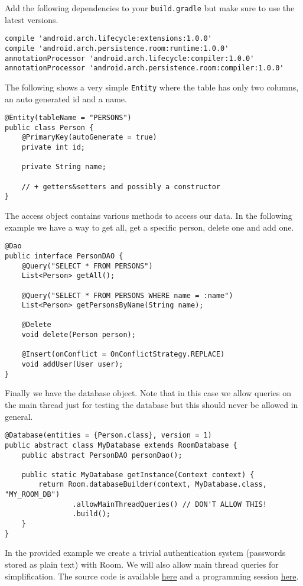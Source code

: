 Add the following dependencies to your \texttt{build.gradle} but make sure to use the latest versions.
\begin{lstlisting}[style=A_txt]
compile 'android.arch.lifecycle:extensions:1.0.0'
compile 'android.arch.persistence.room:runtime:1.0.0'
annotationProcessor 'android.arch.lifecycle:compiler:1.0.0'
annotationProcessor 'android.arch.persistence.room:compiler:1.0.0'
\end{lstlisting}
The following shows a very simple \texttt{Entity} where the table has only two columns, an auto generated id and a name.
\begin{lstlisting}[style=A_Java]
@Entity(tableName = "PERSONS")
public class Person {
    @PrimaryKey(autoGenerate = true)
    private int id;

    private String name;

    // + getters&setters and possibly a constructor
}
\end{lstlisting}
The access object contains various methods to access our data. In the following example we have a way to get all, get a specific person, delete one and add one.
\begin{lstlisting}[style=A_Java]
@Dao
public interface PersonDAO {
    @Query("SELECT * FROM PERSONS")
    List<Person> getAll();

    @Query("SELECT * FROM PERSONS WHERE name = :name")
    List<Person> getPersonsByName(String name);

    @Delete
    void delete(Person person);

    @Insert(onConflict = OnConflictStrategy.REPLACE)
    void addUser(User user);
}
\end{lstlisting}
Finally we have the database object. Note that in this case we allow queries on the main thread just for testing the database but this should never be allowed in general.
\begin{lstlisting}[style=A_Java]
@Database(entities = {Person.class}, version = 1)
public abstract class MyDatabase extends RoomDatabase {
    public abstract PersonDAO personDao();

    public static MyDatabase getInstance(Context context) {
        return Room.databaseBuilder(context, MyDatabase.class, "MY_ROOM_DB")
                .allowMainThreadQueries() // DON'T ALLOW THIS!
                .build();
    }
}
\end{lstlisting}
In the provided example we create a trivial authentication system (passwords stored as plain text) with Room. We will also allow main thread queries for simplification. The source code is available \href{https://github.com/JonSteinn/AndroidDevelopment/tree/master/examples/lab5/roomdb}{here} and a programming session \href{TODO}{here}.

